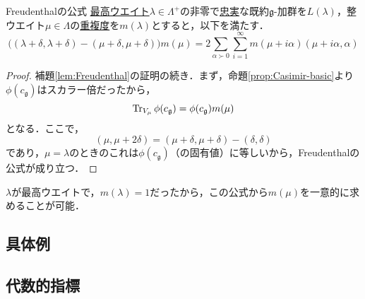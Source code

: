 \documentclass[rep_main]{subfiles}
\begin{document}
\begin{mytheo}[label=thm:Freudenthal]{Freudenthalの公式}
	\hyperref[def:highest-weight-module]{最高ウエイト}$\lambda \in \Lambda^+$の非零で\hyperref[def:faithful]{忠実}な既約$\mathfrak{g}$-加群を$L(\lambda)$，整ウエイト$\mu \in \Lambda$の\hyperref[def:mutiplicity]{重複度}を$m(\lambda)$とすると，以下を満たす．
	\begin{equation}
		\big((\lambda + \delta, \lambda + \delta) - (\mu + \delta, \mu + \delta)\big)m(\mu) = 2\sum_{\alpha \succ 0}\sum_{i=1}^\infty m(\mu + i\alpha)(\mu + i\alpha, \alpha)
	\end{equation}
\end{mytheo}
\begin{proof}
	補題\ref{lem:Freudenthal}の証明の続き．まず，命題\ref{prop:Casimir-basic}より$\phi(c_\mathfrak{g})$はスカラー倍だったから，
	\begin{equation}
		\Tr_{V_\mu} \phi(c_\mathfrak{g}) = \phi(c_\mathfrak{g})m(\mu)
	\end{equation}
	となる．ここで，
	\begin{equation}
		(\mu, \mu + 2\delta) = (\mu + \delta, \mu + \delta) - (\delta, \delta)
	\end{equation}
	であり，$\mu = \lambda$のときのこれは$\phi(c_\mathfrak{g})$（の固有値）に等しいから，Freudenthalの公式が成り立つ．
\end{proof}
$\lambda$が最高ウエイトで，\hyperref[thm:hwmodule-c]{$m(\lambda)=1$}だったから，この公式から$m(\mu)$を一意的に求めることが可能．
\subsection{具体例}

\subsection{代数的指標}
\end{document}
